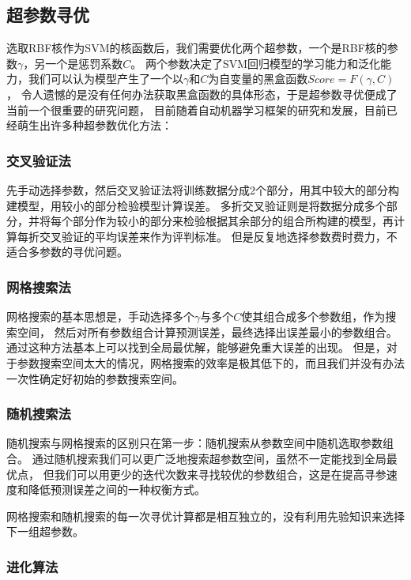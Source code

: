 \subsection{超参数寻优}

选取RBF核作为SVM的核函数后，我们需要优化两个超参数，一个是RBF核的参数$\gamma$，另一个是惩罚系数$C$。
两个参数决定了SVM回归模型的学习能力和泛化能力，我们可以认为模型产生了一个以$\gamma$和$C$为自变量的黑盒函数$Score=F(\gamma,C)$，
令人遗憾的是没有任何办法获取黑盒函数的具体形态，于是超参数寻优便成了当前一个很重要的研究问题，
目前随着自动机器学习框架的研究和发展，目前已经萌生出许多种超参数优化方法：

\subsubsection{交叉验证法}

先手动选择参数，然后交叉验证法将训练数据分成2个部分，用其中较大的部分构建模型，用较小的部分检验模型计算误差。
多折交叉验证则是将数据分成多个部分，并将每个部分作为较小的部分来检验根据其余部分的组合所构建的模型，再计算每折交叉验证的平均误差来作为评判标准。
但是反复地选择参数费时费力，不适合多参数的寻优问题。

\subsubsection{网格搜索法}

网格搜索的基本思想是，手动选择多个$\gamma$与多个$C$使其组合成多个参数组，作为搜索空间，
然后对所有参数组合计算预测误差，最终选择出误差最小的参数组合。
通过这种方法基本上可以找到全局最优解，能够避免重大误差的出现。
但是，对于参数搜索空间太大的情况，网格搜索的效率是极其低下的，而且我们并没有办法一次性确定好初始的参数搜索空间。

\subsubsection{随机搜索法}

随机搜索与网格搜索的区别只在第一步：随机搜索从参数空间中随机选取参数组合。
通过随机搜索我们可以更广泛地搜索超参数空间，虽然不一定能找到全局最优点，
但我们可以用更少的迭代次数来寻找较优的参数组合，这是在提高寻参速度和降低预测误差之间的一种权衡方式。

网格搜索和随机搜索的每一次寻优计算都是相互独立的，没有利用先验知识来选择下一组超参数。

\subsubsection{进化算法}

